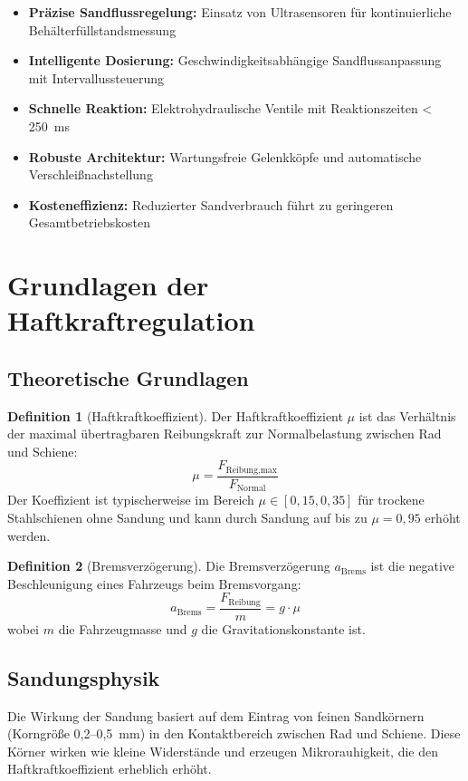 \documentclass[a4paper,12pt]{article}
\theoremstyle{definition}
\newtheorem{definition}{Definition}
\begin{document}
\begin{itemize}
	\item \textbf{Präzise Sandflussregelung:} Einsatz von Ultrasensoren für kontinuierliche Behälterfüllstandsmessung
	\item \textbf{Intelligente Dosierung:} Geschwindigkeitsabhängige Sandflussanpassung mit Intervallussteuerung
	\item \textbf{Schnelle Reaktion:} Elektrohydraulische Ventile mit Reaktionszeiten < 250~ms
	\item \textbf{Robuste Architektur:} Wartungsfreie Gelenkköpfe und automatische Verschleißnachstellung
	\item \textbf{Kosteneffizienz:} Reduzierter Sandverbrauch führt zu geringeren Gesamtbetriebskosten
\end{itemize}

\section{Grundlagen der Haftkraftregulation}

\subsection{Theoretische Grundlagen}

\begin{definition}[Haftkraftkoeffizient]
	Der Haftkraftkoeffizient $\mu$ ist das Verhältnis der maximal übertragbaren Reibungskraft zur Normalbelastung zwischen Rad und Schiene:
	\[
	\mu = \frac{F_{\text{Reibung,max}}}{F_{\text{Normal}}}
	\]
	Der Koeffizient ist typischerweise im Bereich $\mu \in [0,15, 0,35]$ für trockene Stahlschienen ohne Sandung und kann durch Sandung auf bis zu $\mu = 0,95$ erhöht werden.
\end{definition}

\begin{definition}[Bremsverzögerung]
	Die Bremsverzögerung $a_{\text{Brems}}$ ist die negative Beschleunigung eines Fahrzeugs beim Bremsvorgang:
	\[
	a_{\text{Brems}} = \frac{F_{\text{Reibung}}}{m} = g \cdot \mu
	\]
	wobei $m$ die Fahrzeugmasse und $g$ die Gravitationskonstante ist.
\end{definition}

\subsection{Sandungsphysik}

Die Wirkung der Sandung basiert auf dem Eintrag von feinen Sandkörnern (Korngröße 0,2--0,5~mm) in den Kontaktbereich zwischen Rad und Schiene. Diese Körner wirken wie kleine Widerstände und erzeugen Mikrorauhigkeit, die den Haftkraftkoeffizient erheblich erhöht.
\end{document}

